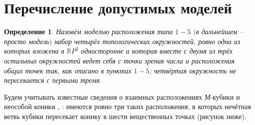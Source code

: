 \documentclass[14pt]{article}
\newtheorem{definition}{Определение}
\begin{document}
\section{Перечисление допустимых моделей}
\begin{definition}
Назовём моделью расположения типа $1-5$ $($в дальнейшем -- просто модель$)$ набор четырёх топологических окружностей, ровно одна из которых вложена в $\mathbb RP^2$ односторонне и которая вместе с двумя из трёх остальных окружностей ведет себя с точки зрения числа и расположения общих точек так, как описано в пунктах $1-5$; четвёртая окружность не пересекается с первыми тремя.
\end{definition}

Будем учитывать известные сведения о взаимных расположениях \textit{М}-кубики и неособой коники \cite{litlink2}, \cite{litlink3}: имеются ровно три таких расположения, в которых нечётная ветвь кубики пересекает конику в шести вещественных точках (рисунок ниже).
\end{document}

